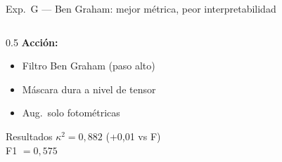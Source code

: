 \documentclass[aspectratio=169, 11pt]{beamer}
\begin{document}
\begin{frame}{Exp.~G --- Ben Graham: mejor métrica, peor interpretabilidad}

  \begin{columns}[T]
    \begin{column}{0.5\textwidth}
      \textbf{Acción:}
      \begin{itemize}
        \item Filtro Ben Graham (paso alto)
        \item Máscara dura a nivel de tensor
        \item Aug.\ solo fotométricas
      \end{itemize}

      \begin{block}{Resultados}
        $\kappa^2 = 0{,}882$ (+0,01 vs F)\\
        F1 $= 0{,}575$
      \end{block}


\end{column}
\end{columns}
\end{frame}
\end{document}
